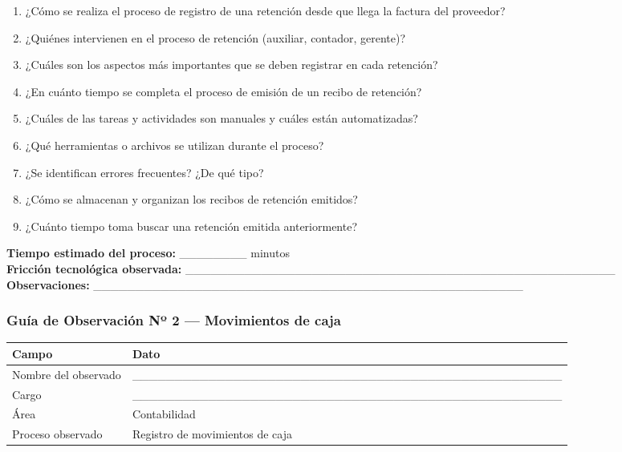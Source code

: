 \documentclass[stu]{apa7}
\begin{document}
\vspace{0.3cm}

\begin{enumerate}
    \item ¿Cómo se realiza el proceso de registro de una retención desde que llega la factura del proveedor?
    \item ¿Quiénes intervienen en el proceso de retención (auxiliar, contador, gerente)?
    \item ¿Cuáles son los aspectos más importantes que se deben registrar en cada retención?
    \item ¿En cuánto tiempo se completa el proceso de emisión de un recibo de retención?
    \item ¿Cuáles de las tareas y actividades son manuales y cuáles están automatizadas?
    \item ¿Qué herramientas o archivos se utilizan durante el proceso?
    \item ¿Se identifican errores frecuentes? ¿De qué tipo?
    \item ¿Cómo se almacenan y organizan los recibos de retención emitidos?
    \item ¿Cuánto tiempo toma buscar una retención emitida anteriormente?
\end{enumerate}

\vspace{0.3cm}

\textbf{Tiempo estimado del proceso:} \_\_\_\_\_\_\_\_ minutos \\
\textbf{Fricción tecnológica observada:} \_\_\_\_\_\_\_\_\_\_\_\_\_\_\_\_\_\_\_\_\_\_\_\_\_\_\_\_\_\_\_\_\_\_\_\_\_\_\_\_\_\_\_\_\_\_\_\_\_\_\_ \\
\textbf{Observaciones:} \_\_\_\_\_\_\_\_\_\_\_\_\_\_\_\_\_\_\_\_\_\_\_\_\_\_\_\_\_\_\_\_\_\_\_\_\_\_\_\_\_\_\_\_\_\_\_\_\_\_\_

\newpage

\subsubsection{Guía de Observación Nº 2 --- Movimientos de caja}

\begin{tabularx}{\textwidth}{|l|X|}
\hline
\rowcolor[gray]{0.9}
\textbf{Campo} & \textbf{Dato} \\
\hline
Nombre del observado & \_\_\_\_\_\_\_\_\_\_\_\_\_\_\_\_\_\_\_\_\_\_\_\_\_\_\_\_\_\_\_\_\_\_\_\_\_\_\_\_\_\_\_\_\_\_\_\_\_\_\_ \\
\hline
Cargo & \_\_\_\_\_\_\_\_\_\_\_\_\_\_\_\_\_\_\_\_\_\_\_\_\_\_\_\_\_\_\_\_\_\_\_\_\_\_\_\_\_\_\_\_\_\_\_\_\_\_\_ \\
\hline
Área & Contabilidad \\
\hline
Proceso observado & Registro de movimientos de caja \\
\hline
\end{tabularx}
\end{document}
